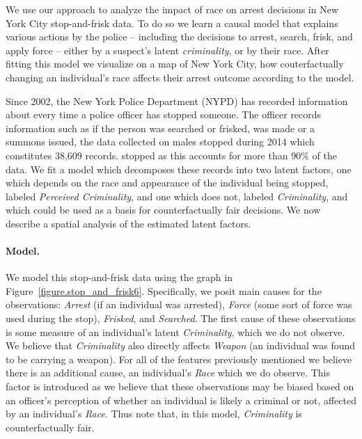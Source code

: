 We use our approach to analyze the impact of race on arrest decisions in New York City stop-and-frisk data. To do so we learn a causal model that explains various actions by the police -- including the decisions to arrest, search, frisk, and apply force -- either by a suspect's latent \emph{criminality}, or by their race. After fitting this model we visualize on a map of New York City, how couterfactually changing an individual's race affects their arrest outcome according to the model. 


Since 2002, the New York Police Department (NYPD) has recorded
information about every time a police officer has stopped someone. The
officer records information such as if the person was searched or
frisked, %
was made or a summons issued, %
the data collected on males stopped during 2014 which constitutes
38,609 records. %
stopped as this accounts for more than $90\%$ of the data.  We fit a
model which decomposes these records into two latent factors, one
which depends on the race and appearance of the individual being
stopped, labeled \emph{Perceived Criminality}, and one which does not,
labeled \emph{Criminality}, and which could be used as a basis for
counterfactually fair decisions. We now describe a spatial analysis of
the estimated latent factors.


\paragraph{Model.}
We model this stop-and-frisk data using the graph in
Figure~\ref{figure.stop_and_frisk6}. Specifically, we posit main causes
for the observations: \emph{Arrest} (if an individual was arrested),
\emph{Force} (some sort of force was used during the stop),
\emph{Frisked}, and \emph{Searched}. The first cause of these
observations is some measure of an individual's latent
\emph{Criminality}, which we do not observe. We believe that \emph{Criminality} also directly affects \emph{Weapon} (an individual was found to be carrying a weapon). For all of the features previously mentioned we believe there is an additional cause, an individual's \emph{Race} which we do observe. This factor is introduced
as we believe that these observations may be biased based on an
officer's perception of whether an individual is likely a criminal or
not, affected by an individual's \emph{Race}. Thus note that, in this model, \emph{Criminality} is counterfactually fair.

